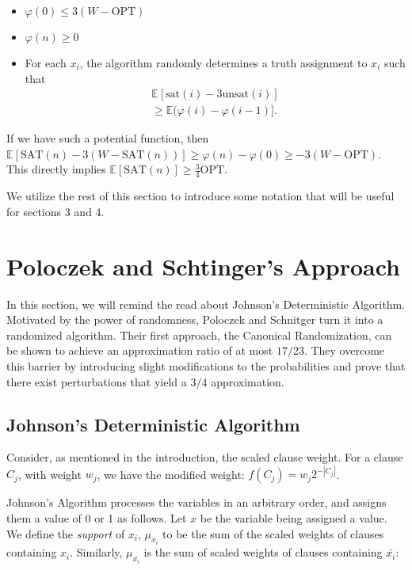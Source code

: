 \documentclass[11pt,letter]{article}
\numberwithin{theorem}{section}
\renewcommand{\phi}{\varphi}
\begin{document}
\begin{itemize}
	\item $\phi(0) \leq 3(W-\textrm{OPT})$
	\item $\phi(n) \geq 0$
	\item For each $x_i$, the algorithm randomly determines a truth assignment to $x_i$ such that
\begin{equation}
\begin{aligned}
\label{eq:2}
\mathbb{E}[\mathrm{sat}(i) - 3\mathrm{unsat}(i)] \\
\geq \mathbb{E}(\phi(i) - \phi(i-1)].
\end{aligned}
\end{equation}
\end{itemize}

If we have such a potential function, then $\mathbb{E}[\textrm{SAT}(n)- 3\left(W-\textrm{SAT}(n)\right)] \geq \phi(n) - \phi(0) \geq -3(W-\textrm{OPT})$.
This directly implies $\mathbb{E}[\textrm{SAT}(n)] \geq \frac{3}{4} \textrm{OPT}$.

We utilize the rest of this section to introduce some notation that will be useful for sections 3 and 4.


\section{Poloczek and Schtinger's Approach}\label{S:PS}

In this section,
we will remind the read about Johnson's Deterministic Algorithm. Motivated by the power of randomness, Poloczek and Schnitger 
turn it into a randomized algorithm. Their first approach, the Canonical Randomization, can be shown to achieve an approximation ratio of at most $17/23$. 
They overcome this barrier by introducing slight modifications to the probabilities and prove that there exist perturbations that yield a $3/4$ approximation. 

\subsection*{Johnson's Deterministic Algorithm}

Consider, as mentioned in the introduction, the scaled clause weight.
For a clause $C_j$, with weight $w_j$, we have the modified weight:  $f(C_j) = w_j 2^{-|C_j|}$.

Johnson's Algorithm processes the variables in an arbitrary order, and assigns them a value of 0 or 1 as follows. Let $x$ be the variable being assigned a value. We define the \emph{support} of $x_i$, $\mu_{x_i}$ to be the sum of the scaled weights of clauses containing $x_i$. Similarly, $\mu_{\bar{x_i}}$ is the sum of scaled weights of clauses containing $\bar{x_i}$:
\end{document}
